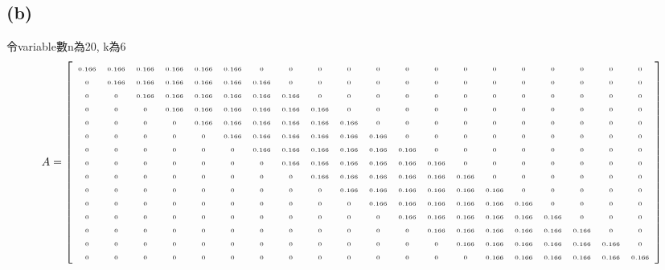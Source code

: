 \documentclass[12pt]{article}
\begin{document}
    \subsection*{(b)}
        令variable數n為20, k為6
        \[  \fontsize{5}{2}
            A=
            \left[
            \begin{array}{cccccccccccccccccccc}
                0.166 & 0.166 & 0.166 & 0.166 & 0.166 & 0.166 & 0 & 0 & 0 & 0 & 0 & 0 & 0 & 0 & 0 & 0 & 0 & 0 & 0 & 0\\
                0 & 0.166 & 0.166 & 0.166 & 0.166 & 0.166 & 0.166 & 0 & 0 & 0 & 0 & 0 & 0 & 0 & 0 & 0 & 0 & 0 & 0 & 0\\
                0 & 0 & 0.166 & 0.166 & 0.166 & 0.166 & 0.166 & 0.166 & 0 & 0 & 0 & 0 & 0 & 0 & 0 & 0 & 0 & 0 & 0 & 0\\
                0 & 0 & 0 & 0.166 & 0.166 & 0.166 & 0.166 & 0.166 & 0.166 & 0 & 0 & 0 & 0 & 0 & 0 & 0 & 0 & 0 & 0 & 0\\
                0 & 0 & 0 & 0 & 0.166 & 0.166 & 0.166 & 0.166 & 0.166 & 0.166 & 0 & 0 & 0 & 0 & 0 & 0 & 0 & 0 & 0 & 0\\
                0 & 0 & 0 & 0 & 0 & 0.166 & 0.166 & 0.166 & 0.166 & 0.166 & 0.166 & 0 & 0 & 0 & 0 & 0 & 0 & 0 & 0 & 0\\
                0 & 0 & 0 & 0 & 0 & 0 & 0.166 & 0.166 & 0.166 & 0.166 & 0.166 & 0.166 & 0 & 0 & 0 & 0 & 0 & 0 & 0 & 0\\
                0 & 0 & 0 & 0 & 0 & 0 & 0 & 0.166 & 0.166 & 0.166 & 0.166 & 0.166 & 0.166 & 0 & 0 & 0 & 0 & 0 & 0 & 0\\
                0 & 0 & 0 & 0 & 0 & 0 & 0 & 0 & 0.166 & 0.166 & 0.166 & 0.166 & 0.166 & 0.166 & 0 & 0 & 0 & 0 & 0 & 0\\
                0 & 0 & 0 & 0 & 0 & 0 & 0 & 0 & 0 & 0.166 & 0.166 & 0.166 & 0.166 & 0.166 & 0.166 & 0 & 0 & 0 & 0 & 0\\
                0 & 0 & 0 & 0 & 0 & 0 & 0 & 0 & 0 & 0 & 0.166 & 0.166 & 0.166 & 0.166 & 0.166 & 0.166 & 0 & 0 & 0 & 0\\
                0 & 0 & 0 & 0 & 0 & 0 & 0 & 0 & 0 & 0 & 0 & 0.166 & 0.166 & 0.166 & 0.166 & 0.166 & 0.166 & 0 & 0 & 0\\
                0 & 0 & 0 & 0 & 0 & 0 & 0 & 0 & 0 & 0 & 0 & 0 & 0.166 & 0.166 & 0.166 & 0.166 & 0.166 & 0.166 & 0 & 0\\
                0 & 0 & 0 & 0 & 0 & 0 & 0 & 0 & 0 & 0 & 0 & 0 & 0 & 0.166 & 0.166 & 0.166 & 0.166 & 0.166 & 0.166 & 0\\
                0 & 0 & 0 & 0 & 0 & 0 & 0 & 0 & 0 & 0 & 0 & 0 & 0 & 0 & 0.166 & 0.166 & 0.166 & 0.166 & 0.166 & 0.166\\
            \end{array}
            \right]
        \]
\end{document}
